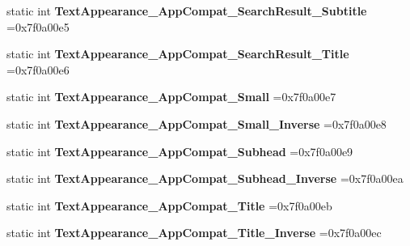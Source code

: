 \begin{DoxyCompactItemize}
static int {\bfseries Text\+Appearance\+\_\+\+App\+Compat\+\_\+\+Search\+Result\+\_\+\+Subtitle} =0x7f0a00e5
\item 
\mbox{\label{classandroid_1_1support_1_1v7_1_1mediarouter_1_1R_1_1style_a56b348ea7436c9d65d7ad207d7079c39}} 
static int {\bfseries Text\+Appearance\+\_\+\+App\+Compat\+\_\+\+Search\+Result\+\_\+\+Title} =0x7f0a00e6
\item 
\mbox{\label{classandroid_1_1support_1_1v7_1_1mediarouter_1_1R_1_1style_a47ec3c335350fc1d79826cddfaac5408}} 
static int {\bfseries Text\+Appearance\+\_\+\+App\+Compat\+\_\+\+Small} =0x7f0a00e7
\item 
\mbox{\label{classandroid_1_1support_1_1v7_1_1mediarouter_1_1R_1_1style_a43341da64da2b60eac317ccbcdae8cff}} 
static int {\bfseries Text\+Appearance\+\_\+\+App\+Compat\+\_\+\+Small\+\_\+\+Inverse} =0x7f0a00e8
\item 
\mbox{\label{classandroid_1_1support_1_1v7_1_1mediarouter_1_1R_1_1style_a82441d8a4e5fd420723133aaeb2be22e}} 
static int {\bfseries Text\+Appearance\+\_\+\+App\+Compat\+\_\+\+Subhead} =0x7f0a00e9
\item 
\mbox{\label{classandroid_1_1support_1_1v7_1_1mediarouter_1_1R_1_1style_af49159895768a31740125429571838b3}} 
static int {\bfseries Text\+Appearance\+\_\+\+App\+Compat\+\_\+\+Subhead\+\_\+\+Inverse} =0x7f0a00ea
\item 
\mbox{\label{classandroid_1_1support_1_1v7_1_1mediarouter_1_1R_1_1style_ad090c947525b9349fcc57a1fa6d175a5}} 
static int {\bfseries Text\+Appearance\+\_\+\+App\+Compat\+\_\+\+Title} =0x7f0a00eb
\item 
\mbox{\label{classandroid_1_1support_1_1v7_1_1mediarouter_1_1R_1_1style_a2df504ae6f41ec6ebb2f5373a99d12a3}} 
static int {\bfseries Text\+Appearance\+\_\+\+App\+Compat\+\_\+\+Title\+\_\+\+Inverse} =0x7f0a00ec

\end{DoxyCompactItemize}
